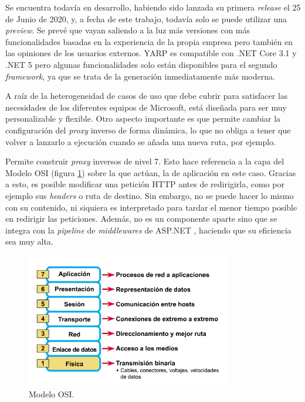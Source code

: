 \documentclass[11pt,spanish,listoffigures]{tfgetsinf}
\begin{document}
Se encuentra todavía en desarrollo, habiendo sido lanzada su primera \emph{release} el 25 de Junio de 2020, y, a fecha de este trabajo, todavía solo se puede utilizar una \emph{preview}. Se prevé que vayan saliendo a la luz más versiones con más funcionalidades basadas en la experiencia de la propia empresa pero también en las opiniones de los usuarios externos. YARP es compatible con .NET Core 3.1 y .NET 5 pero algunas funcionalidades solo están disponibles para el segundo \emph{framework}, ya que se trata de la generación inmediatamente más moderna.

A raíz de la heterogeneidad de casos de uso que debe cubrir para satisfacer las necesidades de los diferentes equipos de Microsoft, está diseñada para ser muy personalizable y flexible. Otro aspecto importante es que permite cambiar la configuración del \emph{proxy} inverso de forma dinámica, lo que no obliga a tener que volver a lanzarlo a ejecución cuando se añada una nueva ruta, por ejemplo.

Permite construir \emph{proxy} inversos de nivel 7. Esto hace referencia a la capa del Modelo OSI (figura \ref{modeloOSI}) sobre la que actúan, la de aplicación en este caso. Gracias a esto, es posible modificar una petición HTTP antes de redirigirla, como por ejemplo sus \emph{headers} o ruta de destino. Sin embargo, no se puede hacer lo mismo con su contenido, ni siquiera es interpretado para tardar el menor tiempo posible en redirigir las peticiones. Además, no es un componente aparte sino que se integra con la \emph{pipeline} de \emph{middlewares} de ASP.NET \cite{MiddlewaresPipeline}, haciendo que su eficiencia sea muy alta.

\begin{figure}[ht]
\centering
\includegraphics[width=0.8\textwidth]{imagenes/modeloOSI}
\caption{Modelo OSI.}
	\label{modeloOSI}
\end{figure}
\end{document}
